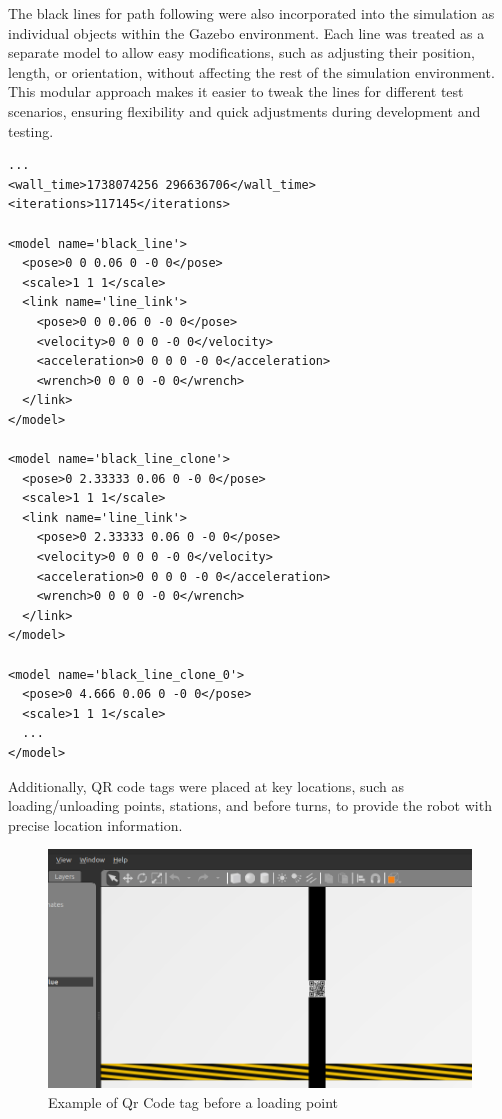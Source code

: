 \documentclass[../../main]{subfiles}
\begin{document}
    The black lines for path following were also incorporated into the simulation as 
    individual objects within the Gazebo environment. Each line was treated as a separate 
    model to allow easy modifications, such as adjusting their position, length, or 
    orientation, without affecting the rest of the simulation environment. This modular 
    approach makes it easier to tweak the lines for different test scenarios, ensuring 
    flexibility and quick adjustments during development and testing.
    \begin{codebox}[]{}
      \begin{verbatim}
...
<wall_time>1738074256 296636706</wall_time>
<iterations>117145</iterations>

<model name='black_line'>
  <pose>0 0 0.06 0 -0 0</pose>
  <scale>1 1 1</scale>
  <link name='line_link'>
    <pose>0 0 0.06 0 -0 0</pose>
    <velocity>0 0 0 0 -0 0</velocity>
    <acceleration>0 0 0 0 -0 0</acceleration>
    <wrench>0 0 0 0 -0 0</wrench>
  </link>
</model>

<model name='black_line_clone'>
  <pose>0 2.33333 0.06 0 -0 0</pose>
  <scale>1 1 1</scale>
  <link name='line_link'>
    <pose>0 2.33333 0.06 0 -0 0</pose>
    <velocity>0 0 0 0 -0 0</velocity>
    <acceleration>0 0 0 0 -0 0</acceleration>
    <wrench>0 0 0 0 -0 0</wrench>
  </link>
</model>

<model name='black_line_clone_0'>
  <pose>0 4.666 0.06 0 -0 0</pose>
  <scale>1 1 1</scale>
  ...
</model>
    \end{verbatim}
  \end{codebox}

    Additionally, QR code tags were placed at key locations, such as loading/unloading points, stations, and before 
    turns, to provide the robot with precise location information.
    
    \begin{figure}[H]
        \centering
    \includegraphics[width=\textwidth]{fig/qr_code_tag.png}
    \caption{Example of Qr Code tag before a loading point}
    \label{Qr Code tags} %
    \end{figure}
\end{document}
